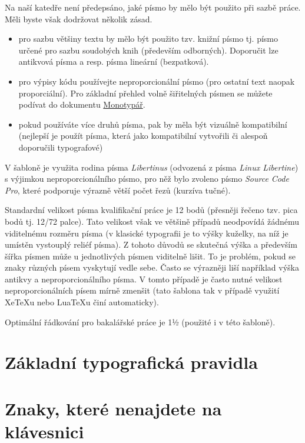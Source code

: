 \documentclass[male,czech,api_bc]{kitheses}
\begin{document}
Na naší katedře není předepsáno, jaké písmo by mělo být použito při sazbě práce. Měli byste však dodržovat několik zásad.

\begin{itemize}
\item pro sazbu většiny textu by mělo být použito tzv. knižní písmo tj. písmo určené
pro sazbu soudobých knih (především odborných). Doporučit lze antikvová písma a resp. písma lineární (bezpatková).
\item pro výpisy kódu používejte neproporcionální písmo (pro ostatní text naopak proporciální). Pro základní přehled 
volně šiřitelných písmen se můžete podívat do dokumentu \href{https://github.com/Jiri-Fiser/thesis_ki_ujep/blob/main/monotyp%C3%A1%C5%99.pdf}{Monotypář}.
\item pokud používáte více druhů písma, pak by měla být vizuálně kompatibilní (nejlepší je použít písma, která jako kompatibilní vytvořili či alespoň doporučili typografové)
\end{itemize}

V šabloně je využita rodina písma \textit{Libertinus} (odvozená z písma \textit{Linux Libertine}) s výjimkou neproporcionálního písmo, pro něž bylo zvoleno písmo \textit{Source Code Pro}, které podporuje výrazně větší počet řezů (kurzíva tučné).

Standardní velikost písma kvalifikační práce je 12 bodů (přesněji řečeno tzv. pica bodů tj. 12/72 palce). Tato velikost však ve většině případů neodpovídá žádnému viditelnému rozměru písma (v klasické typografii je to výšky kuželky, na níž je umístěn vystouplý reliéf písma). Z  tohoto důvodů se skutečná výška a především šířka písmen může u jednotlivých písmen viditelně lišit. To je problém, pokud se znaky různých písem vyskytují vedle sebe. Často se výrazněji liší například výška antikvy a  neproporcionálního písma. V tomto případě je často nutné velikost neproporcionálních písem mírně zmenšit (tato šablona tak v případě využití XeTeXu nebo LuaTeXu činí automaticky).

Optimální řádkování pro bakalářské práce je 1½ (použité i v této šabloně).

\section{Základní typografická pravidla}

\section{Znaky, které nenajdete na klávesnici}
\end{document}
